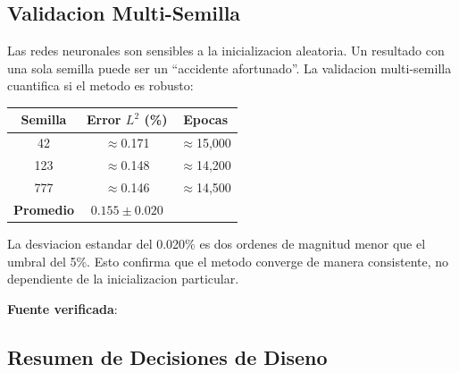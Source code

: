 \vspace{10pt}

\subsection{Validacion Multi-Semilla}

\begin{tcolorbox}[colback=slidelightgreen!40, colframe=ujatgreen,
  title={\bfseries Por que tres semillas?}, coltitle=white, breakable]
Las redes neuronales son sensibles a la inicializacion aleatoria. Un resultado con
una sola semilla puede ser un ``accidente afortunado''. La validacion multi-semilla
cuantifica si el metodo es robusto:

\begin{center}
\begin{tabular}{@{}ccc@{}}
\toprule
\textbf{Semilla} & \textbf{Error $L^2$ (\%)} & \textbf{Epocas} \\
\midrule
42  & $\approx$0.171 & $\approx$15,000 \\
123 & $\approx$0.148 & $\approx$14,200 \\
777 & $\approx$0.146 & $\approx$14,500 \\
\midrule
\textbf{Promedio} & \textbf{$0.155 \pm 0.020$} & \\
\bottomrule
\end{tabular}
\end{center}

La desviacion estandar del 0.020\% es dos ordenes de magnitud menor que el umbral
del 5\%. Esto confirma que el metodo converge de manera consistente, no dependiente
de la inicializacion particular.

\textbf{Fuente verificada}: 
\end{tcolorbox}

\vspace{10pt}

\subsection{Resumen de Decisiones de Diseno}

